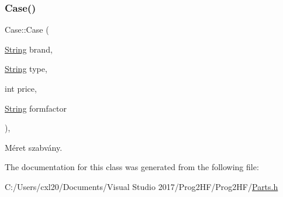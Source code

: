 \subsubsection{\texorpdfstring{Case()}{Case()}}
{\footnotesize\ttfamily Case\+::\+Case (\begin{DoxyParamCaption}\item[{\mbox{\hyperlink{class_string}{String}}}]{brand,  }\item[{\mbox{\hyperlink{class_string}{String}}}]{type,  }\item[{int}]{price,  }\item[{\mbox{\hyperlink{class_string}{String}}}]{formfactor }\end{DoxyParamCaption})\hspace{0.3cm}{\ttfamily [inline]}, {\ttfamily [explicit]}}



Méret szabvány. 



The documentation for this class was generated from the following file\+:\begin{DoxyCompactItemize}
\item 
C\+:/\+Users/cxl20/\+Documents/\+Visual Studio 2017/\+Prog2\+H\+F/\+Prog2\+H\+F/\mbox{\hyperlink{_parts_8h}{Parts.\+h}}\end{DoxyCompactItemize}
